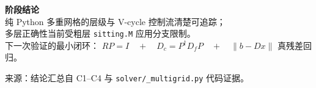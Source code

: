 \documentclass[UTF8,aspectratio=169,11pt]{ctexbeamer}
\newcommand{\source}[1]{%
  \vspace{0.06em}\par{\raggedright\scriptsize\color{muted}来源：#1\par}}
\newcommand{\pathref}[1]{\nolinkurl{#1}}
\begin{document}
\begin{frame}[plain]
  \begin{center}
    \vfill
    {\Large\color{primary}\bfseries 阶段结论}\\[0.6em]
    {\large 纯 Python 多重网格的层级与 V-cycle 控制流清楚可追踪；\\
    多层正确性当前受粗层 \texttt{sitting.M} 应用分支限制。}\\[1em]
    {\small 下一次验证的最小闭环：\quad
    $RP=I\quad+\quad D_c=P^\dagger D_fP\quad+\quad
    \|b-Dx\|$ 真残差回归。}
    \vfill
  \end{center}
  \source{结论汇总自 C1--C4 与 \pathref{solver/_multigrid.py} 代码证据。}
\end{frame}
\end{document}
